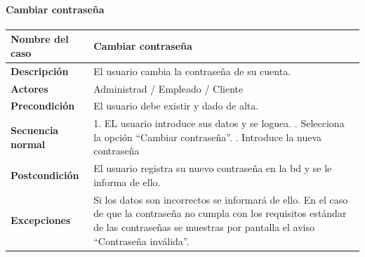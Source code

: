 \paragraph{Cambiar contraseña}
\begin{table}[H]
	\centering
	\small
	\begin{tabularx}{0.8\textwidth}{|p{3.5cm}|X|}
		\hline
		\rowcolor{lightgray}
		\textbf{Nombre del caso}  & \textbf{Cambiar contraseña}                                                                                                                                                                            \\
		\hline
		\textbf{Descripción}      & El usuario cambia la contraseña de su cuenta.                                                                                                                                                          \\
		\hline
		\textbf{Actores}          & Administrad / Empleado / Cliente                                                                                                                                                                       \\
		\hline
		\textbf{Precondición}     & El usuario debe existir y dado de alta.                                                                                                                                                                \\
		\hline
		\textbf{Secuencia normal} & 1. EL usuario introduce sus datos y se loguea. \newline
		2. Selecciona la opción ``Cambiar contraseña''. \newline
		3. Introduce la nueva contraseña                                                                                                                                                                                                   \\
		\hline
		\textbf{Postcondición}    & El usuario registra su nuevo contraseña en la \gls{bd} y se le informa de ello.                                                                                                                        \\
		\hline
		\textbf{Excepciones}      & Si los datos son incorrectos se informará de ello. En el caso de que la contraseña no cumpla con los requisitos estándar de las contraseñas se muestras por pantalla el aviso ``Contraseña inválida''. \\
		\hline
	\end{tabularx}
\end{table}
